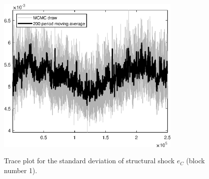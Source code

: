 \begin{figure}[H]
\centering
  \includegraphics[width=0.8\textwidth]{BRS_imp_mobility_alt/graphs/TracePlot_SE_e_C_blck_1}\\
    \caption{Trace plot for the standard deviation of structural shock ${e_C}$ (block number 1).}
\end{figure}
